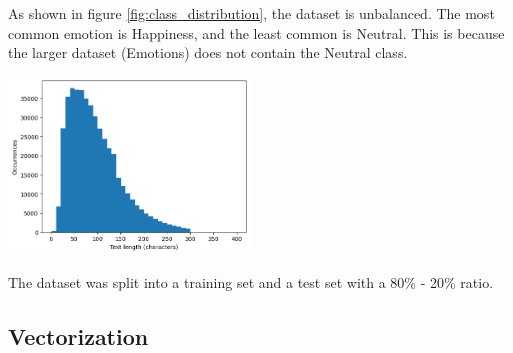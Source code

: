 As shown in figure \ref{fig:class_distribution},
the dataset is unbalanced. The most common
emotion is Happiness, and the least common
is Neutral. This is because the larger dataset
(Emotions) does not contain the Neutral class.

\begingroup
    \centering
    \includegraphics[width=0.48\textwidth]{assets/length_distribution.png}
    \label{fig:length_distribution}
\endgroup

The dataset was split into a training set
and a test set with a 80\% - 20\% ratio.

\subsection{Vectorization}
